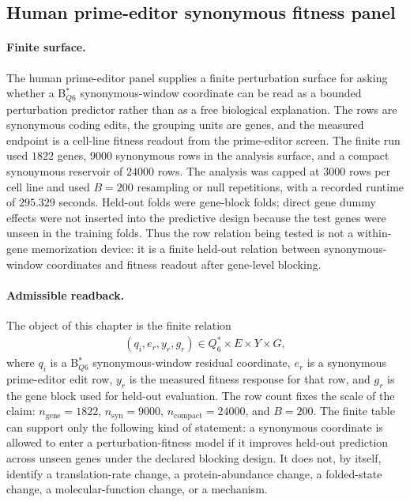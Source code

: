 \subsection{Human prime-editor synonymous fitness panel}
\label{sec:bioreality-human-prime-editor-synonymous-fitness-panel}

\paragraph{Finite surface.}
The human prime-editor panel supplies a finite perturbation surface for asking whether a B$^*_{Q6}$ synonymous-window coordinate can be read as a bounded perturbation predictor rather than as a free biological explanation. The rows are synonymous coding edits, the grouping units are genes, and the measured endpoint is a cell-line fitness readout from the prime-editor screen. The finite run used $1822$ genes, $9000$ synonymous rows in the analysis surface, and a compact synonymous reservoir of $24000$ rows. The analysis was capped at $3000$ rows per cell line and used $B=200$ resampling or null repetitions, with a recorded runtime of $295.329$ seconds. Held-out folds were gene-block folds; direct gene dummy effects were not inserted into the predictive design because the test genes were unseen in the training folds. Thus the row relation being tested is not a within-gene memorization device: it is a finite held-out relation between synonymous-window coordinates and fitness readout after gene-level blocking.

\paragraph{Admissible readback.}
The object of this chapter is the finite relation
$$
\begin{aligned}
(q_i, e_r, y_r, g_r) \in Q_{6}^{*} \times E \times Y \times G,
\end{aligned}
$$
where $q_i$ is a B$^*_{Q6}$ synonymous-window residual coordinate, $e_r$ is a synonymous prime-editor edit row, $y_r$ is the measured fitness response for that row, and $g_r$ is the gene block used for held-out evaluation. The row count fixes the scale of the claim: $n_{\mathrm{gene}}=1822$, $n_{\mathrm{syn}}=9000$, $n_{\mathrm{compact}}=24000$, and $B=200$. The finite table can support only the following kind of statement: a synonymous coordinate is allowed to enter a perturbation-fitness model if it improves held-out prediction across unseen genes under the declared blocking design. It does not, by itself, identify a translation-rate change, a protein-abundance change, a folded-state change, a molecular-function change, or a mechanism.

